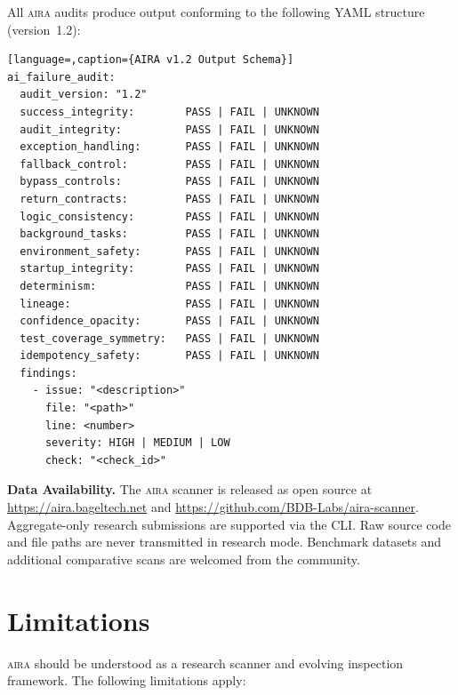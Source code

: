 \documentclass[11pt]{article}
\newcommand{\aira}{\textsc{aira}}
\begin{document}
All \aira{} audits produce output conforming to the following YAML structure (version~1.2):

\begin{lstlisting}[language=,caption={AIRA v1.2 Output Schema}]
ai_failure_audit:
  audit_version: "1.2"
  success_integrity:        PASS | FAIL | UNKNOWN
  audit_integrity:          PASS | FAIL | UNKNOWN
  exception_handling:       PASS | FAIL | UNKNOWN
  fallback_control:         PASS | FAIL | UNKNOWN
  bypass_controls:          PASS | FAIL | UNKNOWN
  return_contracts:         PASS | FAIL | UNKNOWN
  logic_consistency:        PASS | FAIL | UNKNOWN
  background_tasks:         PASS | FAIL | UNKNOWN
  environment_safety:       PASS | FAIL | UNKNOWN
  startup_integrity:        PASS | FAIL | UNKNOWN
  determinism:              PASS | FAIL | UNKNOWN
  lineage:                  PASS | FAIL | UNKNOWN
  confidence_opacity:       PASS | FAIL | UNKNOWN
  test_coverage_symmetry:   PASS | FAIL | UNKNOWN
  idempotency_safety:       PASS | FAIL | UNKNOWN
  findings:
    - issue: "<description>"
      file: "<path>"
      line: <number>
      severity: HIGH | MEDIUM | LOW
      check: "<check_id>"
\end{lstlisting}

\noindent\textbf{Data Availability.} The \aira{} scanner is released as open source at
\url{https://aira.bageltech.net} and \url{https://github.com/BDB-Labs/aira-scanner}.
Aggregate-only research submissions are supported via the CLI. Raw source code and file
paths are never transmitted in research mode. Benchmark datasets and additional comparative
scans are welcomed from the community.

\section{Limitations}
\label{sec:limitations}

\aira{} should be understood as a research scanner and evolving inspection framework.
The following limitations apply:
\end{document}
